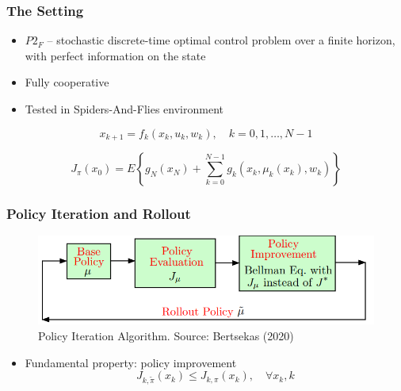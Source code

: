 \documentclass{beamer}
\begin{document}
    \begin{frame}
        \frametitle{The Setting}

        \begin{itemize}
            \item $P2_F$ -- stochastic discrete-time optimal control problem over a finite horizon, with perfect information on the state
            \item Fully cooperative
            \item Tested in Spiders-And-Flies environment
        \end{itemize}

        $$x_{k+1}=f_{k}\left(x_{k}, u_{k}, w_{k}\right), \quad k=0,1, \ldots, N-1$$

        $$J_{\pi}\left(x_{0}\right)=E\left\{g_{N}\left(x_{N}\right)+\sum_{k=0}^{N-1} g_{k}\left(x_{k}, \mu_{k}\left(x_{k}\right), w_{k}\right)\right\}$$


    \end{frame}




    \begin{frame}
        \frametitle{Policy Iteration and Rollout}

        \begin{figure}
            \includegraphics[scale=0.65]{2a_pi}
            \caption{Policy Iteration Algorithm. Source: Bertsekas (2020)}
        \end{figure}


        \begin{itemize}
            \item Fundamental property: policy improvement
            $$J_{k, \tilde{\pi}}\left(x_{k}\right) \leq J_{k, \pi}\left(x_{k}\right), \quad \forall x_{k}, k$$

        \end{itemize}

    \end{frame}

\end{document}
